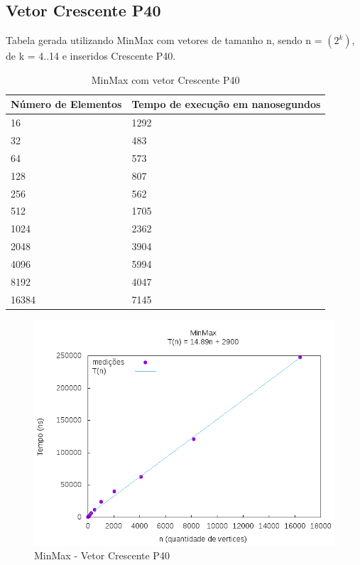 \documentclass[12pt,a4paper,twoside]{report}
\begin{document}
\subsection{Vetor Crescente P40}
Tabela gerada utilizando MinMax com vetores de tamanho n, sendo n = $(2^k)$, de k = 4..14 e inseridos Crescente P40.
\begin{table}[H]
\centering
\caption{MinMax com vetor Crescente P40}
\label{my-label}
\begin{tabular}{|l|l|}
\hline
\multicolumn{1}{|c|}{\textbf{Número de Elementos}} & \multicolumn{1}{c|}{\textbf{Tempo de execução em nanosegundos}} \\ \hline
16 & 1292 \\ \hline
32 & 483 \\ \hline
64 & 573 \\ \hline
128 & 807 \\ \hline
256 & 562 \\ \hline
512 & 1705 \\ \hline
1024 & 2362 \\ \hline
2048 & 3904 \\ \hline
4096 & 5994 \\ \hline
8192 & 4047 \\ \hline
16384 & 7145 \\ \hline
\end{tabular}
\end{table}

\begin{figure}[H]
    \centering
    \includegraphics[width=0.7\linewidth]{graficos/Min Max/Crescente P40/MinMax.png}
  \caption{MinMax - Vetor Crescente P40}
\end{figure}
\end{document}
